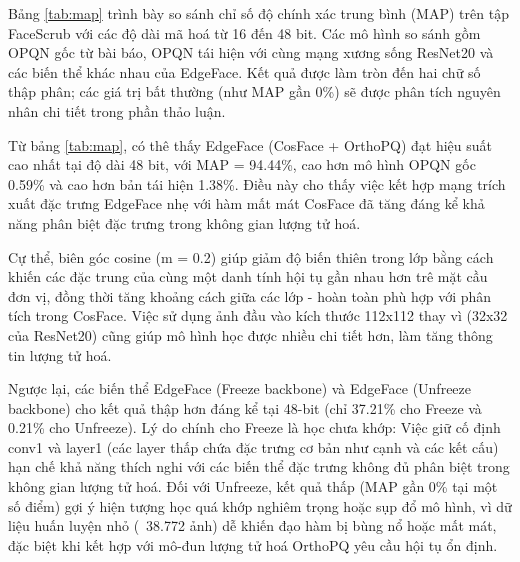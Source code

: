 \begin{table}[htbp]
\centering
\caption{So sánh MAP (\%) trên FaceScrub (seen identities)}
\label{tab:map}
\end{table}

Bảng \ref{tab:map} trình bày so sánh chỉ số độ chính xác trung bình (MAP) trên tập FaceScrub với các độ dài mã hoá từ 16 đến 48 bit. Các mô hình so sánh gồm OPQN gốc từ bài báo, OPQN tái hiện với cùng mạng xương sống ResNet20 và các biến thể khác nhau của EdgeFace. Kết quả được làm tròn đến hai chữ số thập phân; các giá trị bất thường (như MAP gần 0\%) sẽ được phân tích nguyên nhân chi tiết trong phần thảo luận.

Từ bảng \ref{tab:map}, có thê thấy EdgeFace (CosFace + OrthoPQ) đạt hiệu suất cao nhất tại độ dài 48 bit, với MAP = 94.44\%, cao hơn mô hình OPQN gốc 0.59\% và cao hơn bản tái hiện 1.38\%. Điều này cho thấy việc kết hợp mạng trích xuất đặc trưng EdgeFace nhẹ với hàm mất mát CosFace đã tăng đáng kể khả năng phân biệt đặc trưng trong không gian lượng tử hoá. 

Cự thể, biên góc cosine (m = 0.2) giúp giảm độ biến thiên trong lớp bằng cách khiến các đặc trung của cùng một danh tính hội tụ gần nhau hơn trê mặt cầu đơn vị, đồng thời tăng khoảng cách giữa các lớp - hoàn toàn phù hợp với phân tích trong CosFace. Việc sử dụng ảnh đầu vào kích thước 112x112 thay vì (32x32 của ResNet20) cũng giúp mô hình học được nhiều chi tiết hơn, làm tăng thông tin lượng tử hoá.  

Ngược lại, các biến thể EdgeFace (Freeze backbone) và EdgeFace (Unfreeze backbone) cho kết quả thập hơn đáng kể tại 48-bit (chỉ 37.21\% cho Freeze và 0.21\% cho Unfreeze). Lý do chính cho Freeze là học chưa khớp: Việc giữ cố định conv1 và layer1 (các layer thấp chứa đặc trưng cơ bản như cạnh và các kết cấu) hạn chế khả năng thích nghi với các biến thể đặc trưng không đủ phân biệt trong không gian lượng tử hoá. Đối với Unfreeze, kết quả thấp (MAP gần 0\% tại một số điểm) gợi ý hiện tượng học quá khớp nghiêm trọng hoặc sụp đổ mô hình, vì dữ liệu huấn luyện nhỏ (~38.772 ảnh) dễ khiến đạo hàm bị bùng nổ hoặc mất mát, đặc biệt khi kết hợp với mô-đun lượng tử hoá OrthoPQ yêu cầu hội tụ ổn định. 


